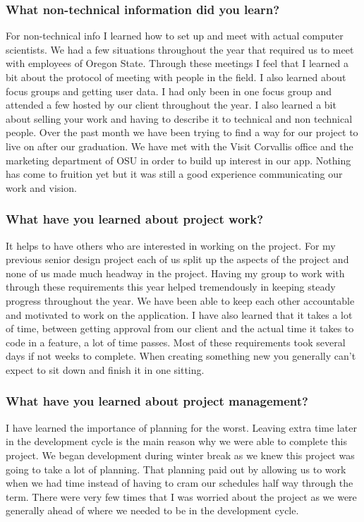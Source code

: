 \documentclass[onecolumn, draftclsnofoot,10pt, compsoc]{IEEEtran}
\begin{document}
    \subsubsection{What non-technical information did you learn?}
      For non-technical info I learned how to set up and meet with actual computer scientists. We had a few situations throughout the year that required us to meet with employees of Oregon State. Through these meetings I feel that I learned a bit about the protocol of meeting with people in the field. I also learned about focus groups and getting user data. I had only been in one focus group and attended a few hosted by our client throughout the year. I also learned a bit about selling your work and having to describe it to technical and non technical people. Over the past month we have been trying to find a way for our project to live on after our graduation. We have met with the Visit Corvallis office and the marketing department of OSU in order to build up interest in our app. Nothing has come to fruition yet but it was still a good experience communicating our work and vision.

    \subsubsection{What have you learned about project work?}
      It helps to have others who are interested in working on the project. For my previous senior design project each of us split up the aspects of the project and none of us made much headway in the project. Having my group to work with through these requirements this year helped tremendously in keeping steady progress throughout the year. We have been able to keep each other accountable and motivated to work on the application. I have also learned that it takes a lot of time, between getting approval from our client and the actual time it takes to code in a feature, a lot of time passes. Most of these requirements took several days if not weeks to complete. When creating something new you generally can’t expect to sit down and finish it in one sitting.

    \subsubsection{What have you learned about project management?}
      I have learned the importance of planning for the worst. Leaving extra time later in the development cycle is the main reason why we were able to complete this project. We began development during winter break as we knew this project was going to take a lot of planning. That planning paid out by allowing us to work when we had time instead of having to cram our schedules half way through the term. There were very few times that I was worried about the project as we were generally ahead of where we needed to be in the development cycle.
\end{document}
